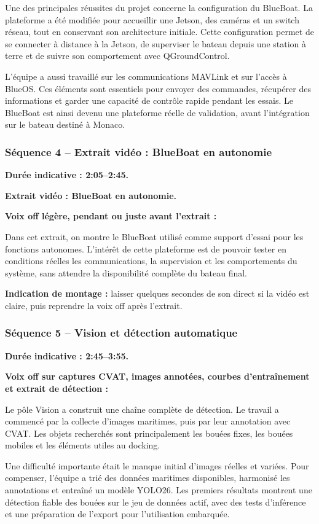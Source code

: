 \documentclass[11pt,letterpaper]{article}
\begin{document}
Une des principales réussites du projet concerne la configuration du BlueBoat. La plateforme a été modifiée pour accueillir une Jetson, des caméras et un switch réseau, tout en conservant son architecture initiale. Cette configuration permet de se connecter à distance à la Jetson, de superviser le bateau depuis une station à terre et de suivre son comportement avec QGroundControl.

L'équipe a aussi travaillé sur les communications MAVLink et sur l'accès à BlueOS. Ces éléments sont essentiels pour envoyer des commandes, récupérer des informations et garder une capacité de contrôle rapide pendant les essais. Le BlueBoat est ainsi devenu une plateforme réelle de validation, avant l'intégration sur le bateau destiné à Monaco.

\subsubsection*{Séquence 4 -- Extrait vidéo : BlueBoat en autonomie}
\textbf{Durée indicative : 2:05--2:45.}

\textbf{Extrait vidéo : BlueBoat en autonomie.}

\textbf{Voix off légère, pendant ou juste avant l'extrait :}

Dans cet extrait, on montre le BlueBoat utilisé comme support d'essai pour les fonctions autonomes. L'intérêt de cette plateforme est de pouvoir tester en conditions réelles les communications, la supervision et les comportements du système, sans attendre la disponibilité complète du bateau final.

\textbf{Indication de montage :} laisser quelques secondes de son direct si la vidéo est claire, puis reprendre la voix off après l'extrait.

\subsubsection*{Séquence 5 -- Vision et détection automatique}
\textbf{Durée indicative : 2:45--3:55.}

\textbf{Voix off sur captures CVAT, images annotées, courbes d'entraînement et extrait de détection :}

Le pôle Vision a construit une chaîne complète de détection. Le travail a commencé par la collecte d'images maritimes, puis par leur annotation avec CVAT. Les objets recherchés sont principalement les bouées fixes, les bouées mobiles et les éléments utiles au docking.

Une difficulté importante était le manque initial d'images réelles et variées. Pour compenser, l'équipe a trié des données maritimes disponibles, harmonisé les annotations et entraîné un modèle YOLO26. Les premiers résultats montrent une détection fiable des bouées sur le jeu de données actif, avec des tests d'inférence et une préparation de l'export pour l'utilisation embarquée.
\end{document}
